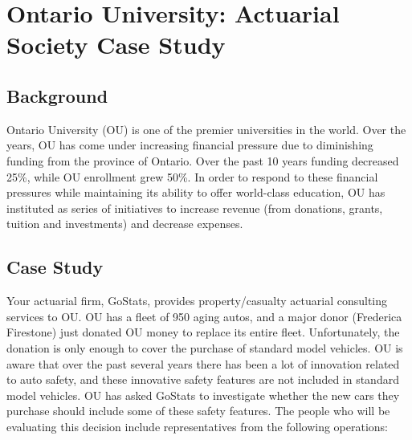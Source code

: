 \documentclass[12pt]{article}
\begin{document}
\section{Ontario University: Actuarial Society Case Study}

\subsection{Background}

Ontario University (OU) is one of the premier universities in the world. Over the years, OU has come under increasing financial pressure due to diminishing funding from the province of Ontario. Over the past 10 years funding decreased 25\%, while OU enrollment grew 50\%. In order to respond to these financial pressures while maintaining its ability to offer world-class education, OU has instituted as series of initiatives to increase revenue (from donations, grants, tuition and investments) and decrease expenses.

\subsection{Case Study}

Your actuarial firm, GoStats, provides property/casualty actuarial consulting services to OU. OU has a fleet of 950 aging autos, and a major donor (Frederica Firestone) just donated OU money to replace its entire fleet. Unfortunately, the donation is only enough to cover the purchase of standard model vehicles. OU is aware that over the past several years there has been a lot of innovation related to auto safety, and these innovative safety features are not included in standard model vehicles. OU has asked GoStats to investigate whether the new cars they purchase should include some of these safety features. The people who will be evaluating this decision include representatives from the following operations:
\end{document}
